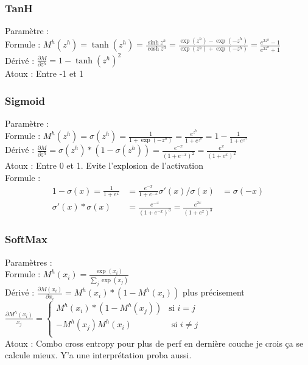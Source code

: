 \documentclass{article}
\begin{document}
\begin{multicols}{2}
\begin{multicols}{2}
\subsubsection{TanH}
Paramètre : \\
Formule : $ M^h(z^h) =  \tanh(z^h) = \frac{\sinh z^h}{\cosh z^h} = \frac{\exp(z^h) - \exp(-z^h)} {\exp(z^h) + \exp(-z^h)} = \frac{e^{2z^h} - 1 }{e^{2z^h} + 1}$ \\
Dérivé : $\frac{\partial M}{\partial z^h} = 1 - \tanh (z^h)^2$ \\
Atoux : Entre -1 et 1


\subsubsection{Sigmoid}
Paramètre : \\
Formule : $ \displaystyle M^h(z^h) =  \sigma(z^h) = \frac{1}{1 + \exp(-z^h)} = \frac{e^{z^h}}{1 + e^{z^h}} = 1 - \frac{1}{1 + e^{z^h}}$ \\
Dérivé : $ \displaystyle \frac{\partial M}{\partial z^h} = \sigma (z^h) * (1 - \sigma (z^h)) = \frac{e^{-x}}{(1 + e^{-x})^2} = \frac{e^{x}}{(1+e^x)^2}$ \\
Atoux : Entre 0 et 1. Evite l'explosion de l'activation \\ 
Formule : \begin{align*}
    1 - \sigma (x) = \frac{1}{1 + e^x} &= \frac{e^{-x}}{1+e^{-x}}
    \sigma '(x) / \sigma (x) &= \sigma (-x) \\
    \sigma '(x) * \sigma (x) &= \frac{e^{-x}}{(1 + e^{-x})^3} = \frac{e^{2x}}{(1 + e^{x})^3}
\end{align*}


\subsubsection{SoftMax}
Paramètres : \\
Formule : $ M^h(x_i) = \frac{\exp(x_i)}{\sum_j \exp(x_j)} $ \\
Dérivé : $ \frac{\partial M(x_i)}{\partial x_i} = M^h(x_i) * (1 - M^h(x_i)) $ plus précisement $ \frac{\partial M^h(x_i)}{x_j} = \begin{cases}
    M^h(x_i) * ( 1 - M^h(x_j) ) &\text{si } i = j \\
    - M^h(x_j) M^h(x_i) &\text{ si } i \neq j \\
\end{cases}  $  \\
Atoux : Combo cross entropy pour plus de perf en dernière couche je crois ça se calcule mieux. Y'a une interprétation proba aussi.



\end{multicols}
\end{multicols}
\end{document}
